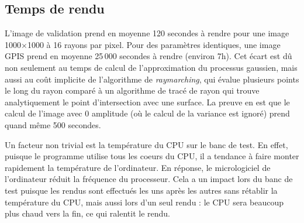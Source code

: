 \subsection{Temps de rendu}

L'image de validation prend en moyenne 120 secondes à rendre pour une image 1000$\times$1000 à 16 rayons par pixel. Pour des paramètres identiques, une image GPIS prend en moyenne 25\,000 secondes à rendre (environ 7h). Cet écart est dû non seulement au temps de calcul de l'approximation du processus gaussien, mais aussi au coût implicite de l'algorithme de \textit{raymarching}, qui évalue plusieurs points le long du rayon comparé à un algorithme de tracé de rayon qui trouve analytiquement le point d'intersection avec une surface. La preuve en est que le calcul de l'image avec 0 amplitude (où le calcul de la variance est ignoré) prend quand même 500 secondes.

Un facteur non trivial est la température du CPU sur le banc de test. En effet, puisque le programme utilise tous les coeurs du CPU, il a tendance à faire monter rapidement la température de l'ordinateur. En réponse, le micrologiciel de l'ordinateur réduit la fréquence du processeur. Cela a un impact lors du banc de test puisque les rendus sont effectués les uns après les autres sans rétablir la température du CPU, mais aussi lors d'un seul rendu : le CPU sera beaucoup plus chaud vers la fin, ce qui ralentit le rendu.
